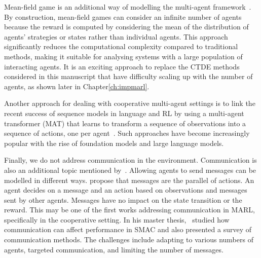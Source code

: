Mean-field game is an additional way of modelling the multi-agent framework~\citep{lauriere2022learning}.
By construction, mean-field games can consider an infinite number of agents because the reward is computed by considering the mean of the distribution of agents' strategies or states rather than individual agents.
This approach significantly reduces the computational complexity compared to traditional methods, making it suitable for analysing systems with a large population of interacting agents.
It is an exciting approach to replace the CTDE methods considered in this manuscript that have difficulty scaling up with the number of agents, as shown later in Chapter\ref{ch:impmarl}.

Another approach for dealing with cooperative multi-agent settings is to link the recent success of sequence models in language and RL by using a multi-agent transformer (MAT) that learns to transform a sequence of observations into a sequence of actions, one per agent~\citep{wen2022multiagent}.
Such approaches have become increasingly popular with the rise of foundation models and large language models.

Finally, we do not address communication in the environment.
Communication is also an additional topic mentioned by~\citep{DecPomdp}.
Allowing agents to send messages can be modelled in different ways.
\cite{foerster2016learning} propose that messages are the parallel of actions.
An agent decides on a message and an action based on observations and messages sent by other agents.
Messages have no impact on the state transition or the reward.
This may be one of the first works addressing communication in MARL, specifically in the cooperative setting.
In his master thesis,~\cite{fombellida2020master} studied how communication can affect performance in SMAC and also presented a survey of communication methods.
The challenges include adapting to various numbers of agents, targeted communication, and limiting the number of messages.